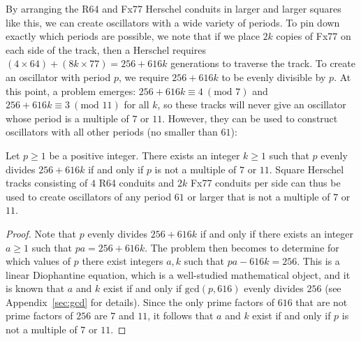 
By arranging the R64 and Fx77 Herschel conduits in larger and larger squares like this, we can create oscillators with a wide variety of periods. To pin down exactly which periods are possible, we note that if we place $2k$ copies of Fx77 on each side of the track, then a Herschel requires $(4 \times 64) + (8k \times 77) = 256 + 616k$ generations to traverse the track. To create an oscillator with period $p$, we require $256 + 616k$ to be evenly divisible by $p$. At this point, a problem emerges: $256 + 616k \equiv 4 \ (\text{mod } 7)$ and $256 + 616k \equiv 3 \ (\text{mod } 11)$ for all $k$, so these tracks will never give an oscillator whose period is a multiple of $7$ or $11$. However, they can be used to construct oscillators with all other periods (no smaller than $61$):

\begin{theorem}\label{thm:Herschel_7_11}
	Let $p \geq 1$ be a positive integer. There exists an integer $k \geq 1$ such that $p$ evenly divides $256 + 616k$ if and only if $p$ is not a multiple of $7$ or $11$. Square Herschel tracks consisting of $4$ R64 conduits and $2k$ Fx77 conduits per side can thus be used to create oscillators of any period $61$ or larger that is not a multiple of $7$ or $11$.
\end{theorem}

\begin{proof}
	Note that $p$ evenly divides $256 + 616k$ if and only if there exists an integer $a \geq 1$ such that $pa = 256 + 616k$. The problem then becomes to determine for which values of $p$ there exist integers $a,k$ such that $pa - 616k = 256$. This is a linear Diophantine equation, which is a well-studied mathematical object, and it is known that $a$ and $k$ exist if and only if $\mathrm{gcd}(p,616)$ evenly divides $256$ (see Appendix~\ref{sec:gcd} for details). Since the only prime factors of $616$ that are not prime factors of $256$ are $7$ and $11$, it follows that $a$ and $k$ exist if and only if $p$ is not a multiple of $7$ or $11$.
\end{proof}

